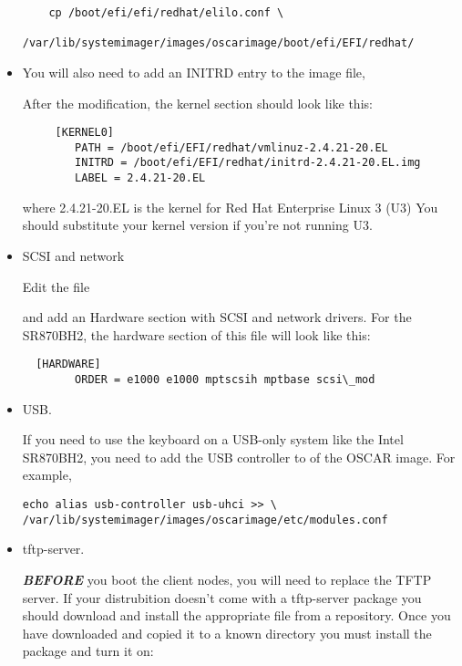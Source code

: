 \begin{itemize}
\begin{verbatim}
    cp /boot/efi/efi/redhat/elilo.conf \
        /var/lib/systemimager/images/oscarimage/boot/efi/EFI/redhat/
\end{verbatim}

\item {}

You will also need to add an INITRD entry to the image file,

After the modification, the kernel section should look like this:

\begin{verbatim}
     [KERNEL0]
        PATH = /boot/efi/EFI/redhat/vmlinuz-2.4.21-20.EL 
        INITRD = /boot/efi/EFI/redhat/initrd-2.4.21-20.EL.img 
        LABEL = 2.4.21-20.EL
\end{verbatim}

where 2.4.21-20.EL is the kernel for Red Hat Enterprise Linux 3 (U3)
You should substitute your kernel version if you're not running U3.


\item SCSI and network

Edit the file


and add an Hardware section with SCSI and network drivers.  For the
SR870BH2, the hardware section of this file will look like this: \\
\begin{verbatim}
  [HARDWARE] 
        ORDER = e1000 e1000 mptscsih mptbase scsi\_mod
\end{verbatim}

\item USB.

If you need to use the keyboard on a USB-only system like the Intel
SR870BH2, you need to add the USB controller to  of
the OSCAR image.  For example,

\begin{verbatim}
echo alias usb-controller usb-uhci >> \
/var/lib/systemimager/images/oscarimage/etc/modules.conf
\end{verbatim}


\item tftp-server.

{\bf \emph{BEFORE}} you boot the client nodes, you will need to replace 
the TFTP server.  If your distrubition doesn't come with a tftp-server 
package you should download and install the appropriate file from a
repository.  Once you have downloaded and copied it to a known
directory you must install the package and turn it on:


\end{itemize}
